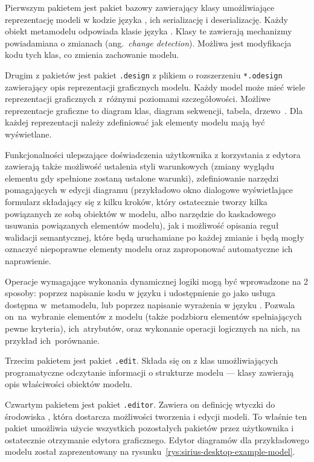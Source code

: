 Pierwszym pakietem jest pakiet bazowy zawierający klasy umożliwiające
reprezentację modeli w
kodzie języka \Java{}, ich serializację i deserializację. Każdy obiekt
metamodelu
odpowiada klasie języka \Java{}. Klasy te zawierają mechanizmy powiadamiana o
zmianach (ang.~\emph{change detection}).
Możliwa jest modyfikacja kodu tych klas, co zmienia zachowanie
modelu.

Drugim z pakietów jest pakiet \texttt{.design} z plikiem o rozszerzeniu
\texttt{*.odesign} zawierający opis reprezentacji graficznych modelu. Każdy
model może mieć wiele reprezentacji graficznych z~różnymi poziomami
szczegółowości.
Możliwe reprezentacje graficzne to diagram klas, diagram
sekwencji, tabela, drzewo~\cite{dokumentacja-sirius-desktop}. Dla każdej
reprezentacji należy zdefiniować jak elementy modelu mają być wyświetlane.

Funkcjonalności ulepszające doświadczenia użytkownika z
korzystania z edytora zawierają także możliwość ustalenia styli warunkowych
(zmiany wyglądu elementu gdy spełnione zostaną ustalone warunki), zdefiniowanie
narzędzi pomagających w edycji diagramu (przykładowo okno dialogowe
wyświetlające formularz składający się z kilku kroków, który ostatecznie tworzy
kilka powiązanych ze sobą obiektów w modelu, albo narzędzie do kaskadowego
usuwania powiązanych elementów modelu), jak i możliwość opisania reguł
walidacji semantycznej, które będą uruchamiane po każdej zmianie i będą mogły
oznaczyć niepoprawne elementy modelu oraz zaproponować automatyczne ich
naprawienie.

Operacje wymagające wykonania dynamicznej logiki mogą być wprowadzone na 2
sposoby: poprzez napisanie kodu w języku \Java{} i udostępnienie go jako usługa
dostępna w~metamodelu, lub poprzez napisanie wyrażenia w języku .
Pozwala on~na~wybranie elementów z modelu (także podzbioru elementów
spełniających pewne kryteria), ich~atrybutów, oraz wykonanie operacji
logicznych na nich, na przykład ich~porównanie.

Trzecim pakietem jest pakiet \texttt{.edit}. Składa się on z klas
umożliwiających programatyczne odczytanie informacji o strukturze modelu ---
klasy zawierają opis właściwości obiektów modelu.

Czwartym pakietem jest pakiet \texttt{.editor}. Zawiera on definicję wtyczki do
środowiska \Eclipse{}, która dostarcza możliwości tworzenia i edycji
modeli. To właśnie ten pakiet umożliwia użycie wszystkich pozostałych pakietów
przez użytkownika i ostatecznie otrzymanie edytora graficznego. Edytor
diagramów dla przykładowego modelu został zaprezentowany na
rysunku~\ref{rys:sirius-desktop-example-model}.

